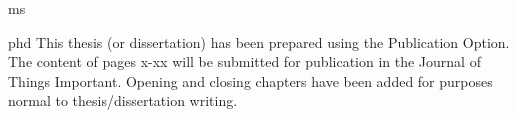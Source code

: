 \documentclass[times,12pt,titlepage]{mstthesis}
\begin{document}

\begin{ThesisTitlePage}{ms}

\author{\MakeUppercase{I. M. Author}}






\memberfive{}


\end{ThesisTitlePage}




\begin{ThesisPublicationOption}{phd}
  This thesis (or dissertation) has been prepared using the
  Publication Option.  The content of pages x-xx will be submitted for
  publication in the Journal of Things Important.  Opening and closing
  chapters have been added for purposes normal to thesis/dissertation
  writing.
\end{ThesisPublicationOption}


\begin{ThesisAbstract}
\lipsum[1]
\end{ThesisAbstract}


\begin{ThesisAcknowledgment}
\lipsum[2-3]
\end{ThesisAcknowledgment}

\begin{ThesisFrontMatter}
\tableofcontents
\listoffigures
\listoftables
\end{ThesisFrontMatter}
\end{document}
